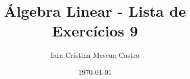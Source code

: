 \documentclass[leqno]{article}
\numberwithin{equation}{section}
\begin{document}
	
	\newtheorem{teo}{Teorema}[section] \newtheorem*{teo*}{Teorema}
	\newtheorem{prop}[teo]{Proposição} \newtheorem*{prop*}{Proposição}
	\newtheorem{lema}[teo]{Lemma} \newtheorem*{lema*}{Lema}
	\newtheorem{cor}[teo]{Corolário} \newtheorem*{cor*}{Corolário}
	
	\theoremstyle{definition}
	\newtheorem{defi}[teo]{Definição} \newtheorem*{defi*}{Definição}
	\newtheorem{exem}[teo]{Exemplo} \newtheorem*{exem*}{Exemplo}
	\newtheorem{obs}[teo]{Observação} \newtheorem*{obs*}{Observação}
	\newtheorem*{hipo}{Hipóteses}
	\newtheorem*{nota}{Notação}
	
	\newcommand{\ds}{\displaystyle} \newcommand{\nl}{\newline}
	\newcommand{\eps}{\varepsilon} \newcommand{\ssty}{\scriptstyle}
	\newcommand{\bE}{\mathbb{E}}
	\newcommand{\cB}{\mathcal{B}}
	\newcommand{\cF}{\mathcal{F}}
	\newcommand{\cA}{\mathcal{A}}
	\newcommand{\cM}{\mathcal{M}}
	\newcommand{\cD}{\mathcal{D}}
	\newcommand{\cN}{\mathcal{N}}
	\newcommand{\cL}{\mathcal{L}}
	\newcommand{\cLN}{\mathcal{LN}}
	\newcommand{\bP}{\mathbb{P}}
	\newcommand{\bQ}{\mathbb{Q}}
	\newcommand{\bN}{\mathbb{N}}
	\newcommand{\bR}{\mathbb{R}}
	\newcommand{\bZ}{\mathbb{Z}}
	\newcommand{\R}{\mathbb{R}}
	\newcommand{\defeq}{\vcentcolon =}
	
	\newcommand{\bfw}{\mathbf{w}}
	\newcommand{\bfv}{\mathbf{v}}
	\newcommand{\bfu}{\mathbf{u}}
	\newcommand{\bfx}{\mathbf{x}}
	\newcommand{\bfb}{\mathbf{b}}
	
	\newcommand{\bvecc}[2]{%
		\begin{bmatrix} #1 \\ #2  \end{bmatrix}
	}
	\newcommand{\bveccc}[3]{%
		\begin{bmatrix} #1 \\ #2 \\ #3  \end{bmatrix}
	}
	
	
	\title{Álgebra Linear - Lista de Exercícios 9}
	
	\author{Iara Cristina Mescua Castro}
	
	\date{\today}
	
	\maketitle
	
\end{document}

